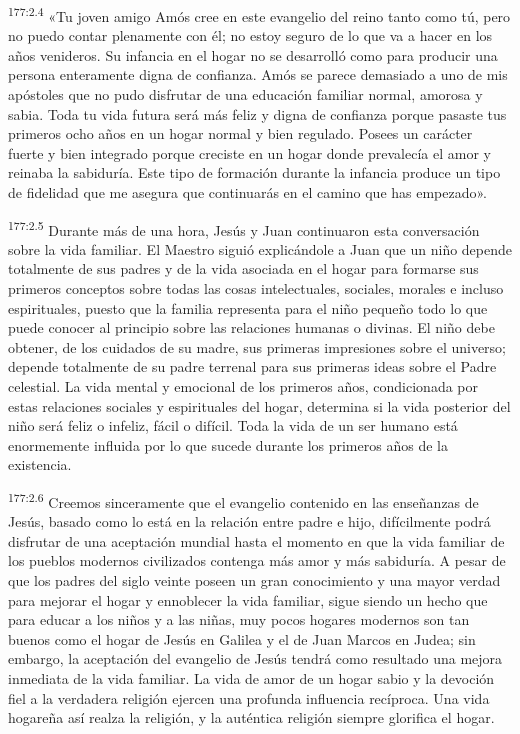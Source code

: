 \par
\textsuperscript{177:2.4} «Tu joven amigo Amós cree en este evangelio del reino tanto como tú, pero no puedo contar plenamente con él; no estoy seguro de lo que va a hacer en los años venideros. Su infancia en el hogar no se desarrolló como para producir una persona enteramente digna de confianza. Amós se parece demasiado a uno de mis apóstoles que no pudo disfrutar de una educación familiar normal, amorosa y sabia. Toda tu vida futura será más feliz y digna de confianza porque pasaste tus primeros ocho años en un hogar normal y bien regulado. Posees un carácter fuerte y bien integrado porque creciste en un hogar donde prevalecía el amor y reinaba la sabiduría. Este tipo de formación durante la infancia produce un tipo de fidelidad que me asegura que continuarás en el camino que has empezado».

\par
\textsuperscript{177:2.5} Durante más de una hora, Jesús y Juan continuaron esta conversación sobre la vida familiar. El Maestro siguió explicándole a Juan que un niño depende totalmente de sus padres y de la vida asociada en el hogar para formarse sus primeros conceptos sobre todas las cosas intelectuales, sociales, morales e incluso espirituales, puesto que la familia representa para el niño pequeño todo lo que puede conocer al principio sobre las relaciones humanas o divinas. El niño debe obtener, de los cuidados de su madre, sus primeras impresiones sobre el universo; depende totalmente de su padre terrenal para sus primeras ideas sobre el Padre celestial. La vida mental y emocional de los primeros años, condicionada por estas relaciones sociales y espirituales del hogar, determina si la vida posterior del niño será feliz o infeliz, fácil o difícil. Toda la vida de un ser humano está enormemente influida por lo que sucede durante los primeros años de la existencia.

\par
\textsuperscript{177:2.6} Creemos sinceramente que el evangelio contenido en las enseñanzas de Jesús, basado como lo está en la relación entre padre e hijo, difícilmente podrá disfrutar de una aceptación mundial hasta el momento en que la vida familiar de los pueblos modernos civilizados contenga más amor y más sabiduría. A pesar de que los padres del siglo veinte poseen un gran conocimiento y una mayor verdad para mejorar el hogar y ennoblecer la vida familiar, sigue siendo un hecho que para educar a los niños y a las niñas, muy pocos hogares modernos son tan buenos como el hogar de Jesús en Galilea y el de Juan Marcos en Judea; sin embargo, la aceptación del evangelio de Jesús tendrá como resultado una mejora inmediata de la vida familiar. La vida de amor de un hogar sabio y la devoción fiel a la verdadera religión ejercen una profunda influencia recíproca. Una vida hogareña así realza la religión, y la auténtica religión siempre glorifica el hogar.

